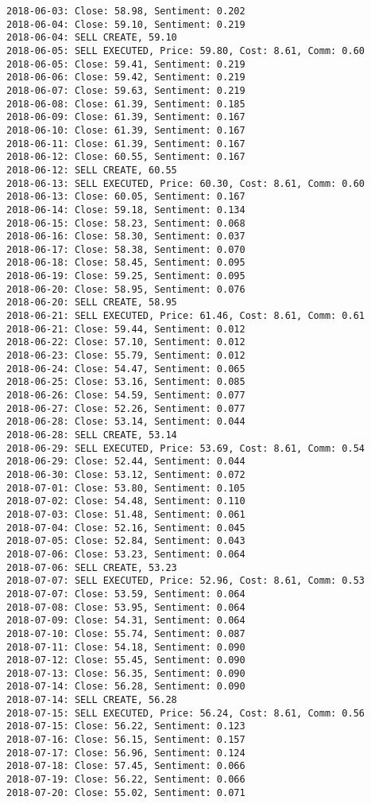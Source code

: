 \documentclass[11pt]{article}
\begin{document}
\begin{Verbatim}[commandchars=\\\{\}]
2018-06-03: Close: 58.98, Sentiment: 0.202
2018-06-04: Close: 59.10, Sentiment: 0.219
2018-06-04: SELL CREATE, 59.10
2018-06-05: SELL EXECUTED, Price: 59.80, Cost: 8.61, Comm: 0.60
2018-06-05: Close: 59.41, Sentiment: 0.219
2018-06-06: Close: 59.42, Sentiment: 0.219
2018-06-07: Close: 59.63, Sentiment: 0.219
2018-06-08: Close: 61.39, Sentiment: 0.185
2018-06-09: Close: 61.39, Sentiment: 0.167
2018-06-10: Close: 61.39, Sentiment: 0.167
2018-06-11: Close: 61.39, Sentiment: 0.167
2018-06-12: Close: 60.55, Sentiment: 0.167
2018-06-12: SELL CREATE, 60.55
2018-06-13: SELL EXECUTED, Price: 60.30, Cost: 8.61, Comm: 0.60
2018-06-13: Close: 60.05, Sentiment: 0.167
2018-06-14: Close: 59.18, Sentiment: 0.134
2018-06-15: Close: 58.23, Sentiment: 0.068
2018-06-16: Close: 58.30, Sentiment: 0.037
2018-06-17: Close: 58.38, Sentiment: 0.070
2018-06-18: Close: 58.45, Sentiment: 0.095
2018-06-19: Close: 59.25, Sentiment: 0.095
2018-06-20: Close: 58.95, Sentiment: 0.076
2018-06-20: SELL CREATE, 58.95
2018-06-21: SELL EXECUTED, Price: 61.46, Cost: 8.61, Comm: 0.61
2018-06-21: Close: 59.44, Sentiment: 0.012
2018-06-22: Close: 57.10, Sentiment: 0.012
2018-06-23: Close: 55.79, Sentiment: 0.012
2018-06-24: Close: 54.47, Sentiment: 0.065
2018-06-25: Close: 53.16, Sentiment: 0.085
2018-06-26: Close: 54.59, Sentiment: 0.077
2018-06-27: Close: 52.26, Sentiment: 0.077
2018-06-28: Close: 53.14, Sentiment: 0.044
2018-06-28: SELL CREATE, 53.14
2018-06-29: SELL EXECUTED, Price: 53.69, Cost: 8.61, Comm: 0.54
2018-06-29: Close: 52.44, Sentiment: 0.044
2018-06-30: Close: 53.12, Sentiment: 0.072
2018-07-01: Close: 53.80, Sentiment: 0.105
2018-07-02: Close: 54.48, Sentiment: 0.110
2018-07-03: Close: 51.48, Sentiment: 0.061
2018-07-04: Close: 52.16, Sentiment: 0.045
2018-07-05: Close: 52.84, Sentiment: 0.043
2018-07-06: Close: 53.23, Sentiment: 0.064
2018-07-06: SELL CREATE, 53.23
2018-07-07: SELL EXECUTED, Price: 52.96, Cost: 8.61, Comm: 0.53
2018-07-07: Close: 53.59, Sentiment: 0.064
2018-07-08: Close: 53.95, Sentiment: 0.064
2018-07-09: Close: 54.31, Sentiment: 0.064
2018-07-10: Close: 55.74, Sentiment: 0.087
2018-07-11: Close: 54.18, Sentiment: 0.090
2018-07-12: Close: 55.45, Sentiment: 0.090
2018-07-13: Close: 56.35, Sentiment: 0.090
2018-07-14: Close: 56.28, Sentiment: 0.090
2018-07-14: SELL CREATE, 56.28
2018-07-15: SELL EXECUTED, Price: 56.24, Cost: 8.61, Comm: 0.56
2018-07-15: Close: 56.22, Sentiment: 0.123
2018-07-16: Close: 56.15, Sentiment: 0.157
2018-07-17: Close: 56.96, Sentiment: 0.124
2018-07-18: Close: 57.45, Sentiment: 0.066
2018-07-19: Close: 56.22, Sentiment: 0.066
2018-07-20: Close: 55.02, Sentiment: 0.071

\end{Verbatim}
\end{document}
